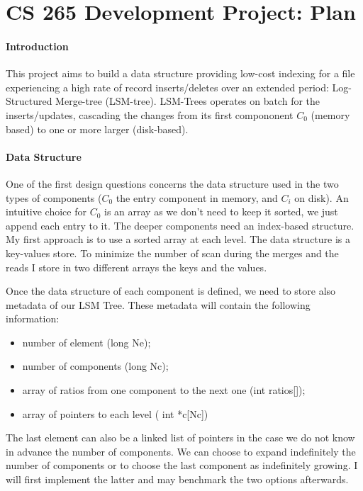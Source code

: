 \documentclass[submit]{harvardml}
\theoremstyle{plain}
\begin{document}
\part*{CS 265 Development Project: Plan}

\subsection*{Introduction}

This project aims to build a data structure providing low-cost indexing for a file experiencing a high rate of record inserts/deletes over an extended period: Log-Structured Merge-tree (LSM-tree). LSM-Trees operates on batch for the inserts/updates, cascading the changes from its first compononent $C_0$ (memory based) to one or more larger (disk-based).


\subsection*{Data Structure}

One of the first design questions concerns the data structure used in the two types of components ($C_0$ the entry component in memory, and $C_i$ on disk). An intuitive choice for $C_0$ is an array as we don't need to keep it sorted, we just append each entry to it. The deeper components need an index-based structure. My first approach is to use a sorted array at each level. The data structure is a key-values store. To minimize the number of scan during the merges and the reads I store in two different arrays the keys and the values.

Once the data structure of each component is defined, we need to store also metadata of our LSM Tree. These metadata will contain the following information:
\begin{itemize}
	\item number of element (long Ne);
	\item number of components (long Nc);
	\item array of ratios from one component to the next one (int ratios[]);
	\item array of pointers to each level ( int *c[Nc])
\end{itemize}

The last element can also be a linked list of pointers in the case we do not know in advance the number of components. We can choose to expand indefinitely the number of components or to choose the last component as indefinitely growing. I will first implement the latter and may benchmark the two options afterwards.
\end{document}
